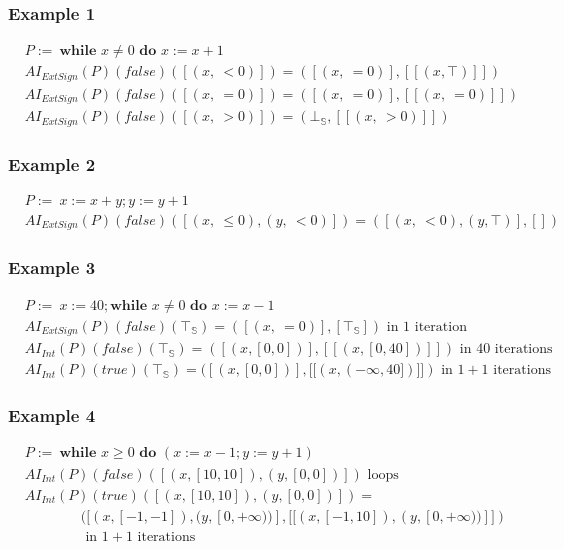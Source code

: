 \documentclass[aspectratio=169]{beamer}
\begin{document}
\begin{frame}
    \frametitle{Example 1}
    \begin{align*}
        &P :=\ \textbf {while } x \ne 0 \textbf { do } x := x + 1 \\
        &AI_{ExtSign} (P) (false) ([(x,\ < 0)]) = ([(x,\ = 0)], [[(x, \top)]]) \\
        &AI_{ExtSign} (P) (false) ([(x,\ = 0)]) = ([(x,\ = 0)], [[(x,\ = 0)]]) \\
        &AI_{ExtSign} (P) (false) ([(x,\ > 0)]) = (\bot_\mathbb{S}, [[(x,\ > 0)]]) 
    \end{align*}
\end{frame}

\begin{frame}
    \frametitle{Example 2}
    \begin{align*}
        &P :=\ x := x + y; y := y + 1 \\
        &AI_{ExtSign} (P) (false) ([(x,\ \le 0), (y,\ < 0)]) = ([(x,\ < 0), (y,\top)], [])
    \end{align*}
\end{frame}

\begin{frame}
    \frametitle{Example 3}
    \begin{align*}
        &P :=\ x := 40; \textbf {while } x \ne 0 \textbf { do } x := x - 1 \\
        &AI_{ExtSign} (P) (false) (\top_\mathbb{S}) = ([(x,\ = 0)], [\top_\mathbb{S}]) \text{ in $1$ iteration}\\
        &AI_{Int} (P) (false) (\top_\mathbb{S}) = ([(x, [0, 0])], [[(x, [0, 40])]]) \text{ in $40$ iterations}\\
        &AI_{Int} (P) (true) (\top_\mathbb{S}) = ([(x, [0, 0])], [[(x, (-\infty, 40])]]) \text{ in $1 + 1$ iterations}
    \end{align*}
\end{frame}

\begin{frame}
    \frametitle{Example 4}
    \begin{align*}
        &P :=\ \textbf {while } x \ge 0 \textbf { do } (x := x - 1; y := y + 1) \\
        &AI_{Int} (P) (false) ([(x, [10, 10]), (y, [0, 0])]) \text{ loops} \\
        &AI_{Int} (P) (true) ([(x, [10, 10]), (y, [0, 0])]) =\\
        & \qquad \qquad ([(x, [-1, -1]), (y, [0, +\infty))], [[(x, [-1, 10]), (y, [0, +\infty))]]) \\
        & \qquad \qquad \text{ in $1 + 1$ iterations}
    \end{align*}
\end{frame}
\end{document}
